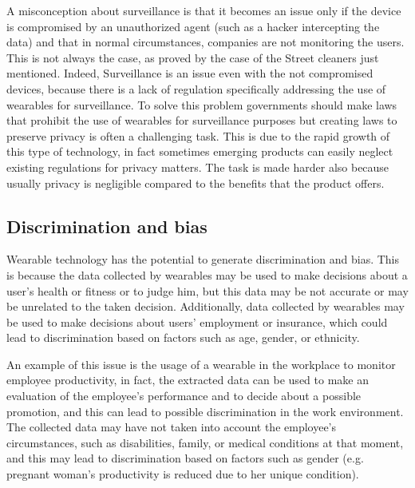 \documentclass{article}
\begin{document}
A misconception about surveillance is that it becomes an issue only if the device is compromised by an unauthorized agent (such as a hacker intercepting the data) and that in normal circumstances, companies are not monitoring the users. This is not always the case, as proved by the case of the Street cleaners just mentioned\cite{noauthor_work_2019}. Indeed, Surveillance is an issue even with the not compromised devices, because there is a lack of regulation specifically addressing the use of wearables for surveillance. To solve this problem governments should make laws that prohibit the use of wearables for surveillance purposes but creating laws to preserve privacy is often a challenging task. This is due to the rapid growth of this type of technology, in fact sometimes emerging products can easily neglect existing regulations for privacy matters. The task is made harder also because usually privacy is negligible compared to the benefits that the product offers.

\subsection{Discrimination and bias}
Wearable technology has the potential to generate discrimination and bias. This is because the data collected by wearables may be used to make decisions about a user's health or fitness or to judge him, but this data may be not accurate or may be unrelated to the taken decision. Additionally, data collected by wearables may be used to make decisions about users' employment or insurance, which could lead to discrimination based on factors such as age, gender, or ethnicity.

An example of this issue is the usage of a wearable in the workplace to monitor employee productivity, in fact, the extracted data can be used to make an evaluation of the employee’s performance and to decide about a possible promotion, and this can lead to possible discrimination in the work environment. The collected data may have not taken into account the employee’s circumstances, such as disabilities, family, or medical conditions at that moment, and this may lead to discrimination based on factors such as gender (e.g. pregnant woman's productivity is reduced due to her unique condition).
\end{document}
